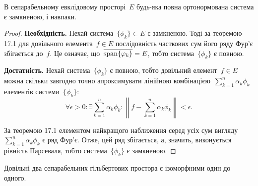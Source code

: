 \begin{theorem}
    В сепарабельному евклідовому просторі~$E$ будь-яка повна ортонормована система є замкненою, і навпаки.
\end{theorem}

\begin{proof}
    \textbf{Необхідність.} Нехай система~$\{\phi_k\} \subset E$ є замкненою. Тоді за \error теоремою 17.1 для довільного елемента~$f \in E$ послідовність часткових сум його ряду Фур'є збігається до~$f$. Це означає, що~$\overline{\operatorname{span} \{\varphi_k\}} = E$, тобто система~$\{\phi_k\}$ є повною.

    \textbf{Достатність.} Нехай система~$\{\phi_k\}$ є повною, тобто довільний елемент~$f \in E$ можна скільки завгодно точно апроксимувати лінійною комбінацією~$\sum_{k = 1}^n \alpha_k \phi_k$ елементів системи~$\{\phi_k\}$:
    \begin{equation*}
        \forall \epsilon > 0: \exists \sum_{k = 1}^n \alpha_k \phi_k:
        \left\| f - \sum_{k = 1}^n \alpha_k \phi_k \right\| < \epsilon.
    \end{equation*}
    
    За \error теоремою 17.1 елементом найкращого наближення серед усіх сум вигляду~$\sum_{k = 1}^n \alpha_k \phi_k$ є ряд Фур'є. Отже, цей ряд збігається, а, значить, виконується рівність Парсеваля, тобто система~$\{\phi_k\}$ є замкненою.
\end{proof}

\begin{theorem}
    Довільні два сепарабельних гільбертових простора є ізоморфними один до одного.
\end{theorem}

